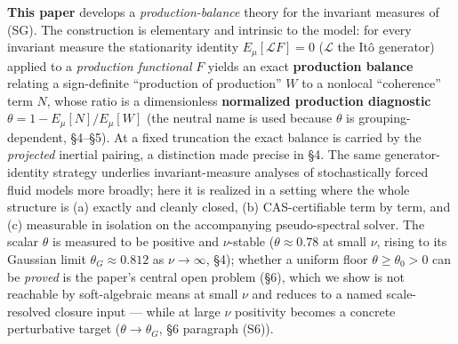 \documentclass[11pt]{article}
\theoremstyle{remark}
\theoremstyle{plain}
\begin{document}
\textbf{This paper} develops a \emph{production-balance} theory for the invariant
measures of (SG). The construction is elementary and intrinsic to the model: for
every invariant measure the stationarity identity $E_\mu[\mathcal{L}F] = 0$
($\mathcal{L}$ the It\^o generator) applied to a \emph{production functional} $F$
yields an exact \textbf{production balance} relating a sign-definite ``production of
production'' $W$ to a nonlocal ``coherence'' term $N$, whose ratio is a
dimensionless \textbf{normalized production diagnostic} $\theta = 1 - E_\mu[N]/E_\mu[W]$
(the neutral name is used because $\theta$ is grouping-dependent, \S4--\S5). At a fixed truncation the exact balance is carried by the
\emph{projected} inertial pairing, a distinction made precise in \S4. The same
generator-identity strategy underlies invariant-measure analyses of stochastically
forced fluid models more broadly; here it is realized in a setting where the whole
structure is (a) exactly and cleanly closed, (b) CAS-certifiable term by term, and
(c) measurable in isolation on the accompanying pseudo-spectral solver. The scalar $\theta$ is
measured to be positive and $\nu$-stable ($\theta \approx 0.78$ at small $\nu$, rising
to its Gaussian limit $\theta_G \approx 0.812$ as $\nu\to\infty$, \S4); whether a
uniform floor $\theta \ge \theta_0 > 0$ can be \emph{proved} is the paper's central open
problem (\S6), which we show is not reachable by soft-algebraic means at small $\nu$ and
reduces to a named scale-resolved closure input --- while at large $\nu$ positivity
becomes a concrete perturbative target ($\theta \to \theta_G$, \S6 paragraph (S6)).
\end{document}
